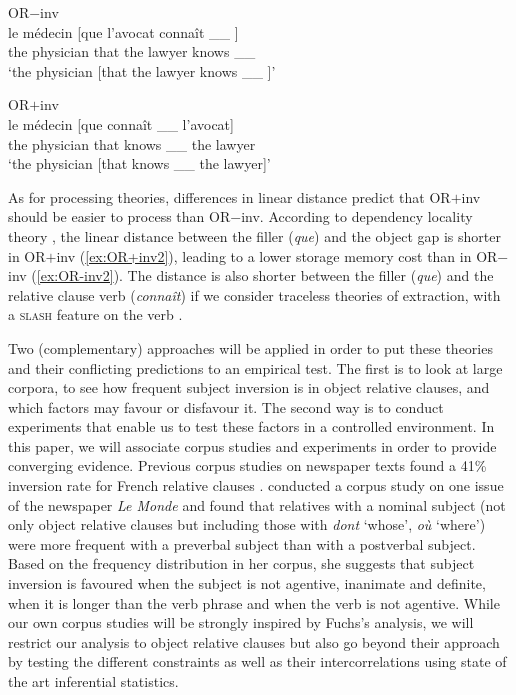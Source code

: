 \documentclass[output=paper]{langscibook}
\begin{document}
\begin{exe}
\ex OR$-$inv \label{ex:OR-inv2}\\ 
\gll le médecin [que l'avocat connaît \_\_ ] \\   
the physician that {the lawyer} knows \_\_ \\
\glt `the physician [that the lawyer knows \_\_ ]'

\ex OR$+$inv \label{ex:OR+inv2}\\ 
\gll le médecin [que connaît \_\_ l'avocat]\\    
the physician that knows \_\_ {the lawyer} \\
\glt `the physician [that knows \_\_ the lawyer]'
\end{exe}

As for processing theories, differences in linear distance predict
that OR$+$inv should be easier to process than OR$-$inv. According to
dependency locality theory \citep{gibson2000}, the linear distance
between the filler (\textit{que}) and the object gap is shorter in
OR$+$inv (\ref{ex:OR+inv2}), leading to a lower storage memory cost than
in OR$-$inv (\ref{ex:OR-inv2}). The distance is also shorter between the
filler (\textit{que}) and the relative clause verb (\textit{connaît})
if we consider traceless theories of extraction, with a \textsc{slash} feature
on the verb \citep{BoumaSag2001, sag2010}.

Two (complementary) approaches will be applied in order to put these
theories and their conflicting predictions to an empirical test. The
first is to look at large corpora, to see how frequent subject
inversion is in object relative clauses, and which factors may favour
or disfavour it. The second way is to conduct experiments that enable us
to test these factors in a controlled environment. In this paper, we
will associate corpus studies and experiments in order to provide
converging evidence.  Previous corpus studies on newspaper texts found
a 41\% inversion rate for French relative clauses
\citep{catherine1997}. \citet{catherine1997} conducted a corpus study
on one issue of the newspaper \textit{Le Monde} and found that
relatives with a nominal subject (not only object relative clauses but
including those with \textit{dont} `whose', \textit{où} `where') were
more frequent with a preverbal subject than with a postverbal
subject. Based on the frequency distribution in her corpus, she
suggests that subject inversion is favoured when the subject is not
agentive, inanimate and definite, when it is longer than the verb
phrase and when the verb is not agentive. While our own corpus studies
will be strongly inspired by Fuchs’s analysis, we will
restrict our analysis to object relative clauses but also go beyond
their approach by testing the different constraints as well as their
intercorrelations using state of the art inferential statistics.
\end{document}
